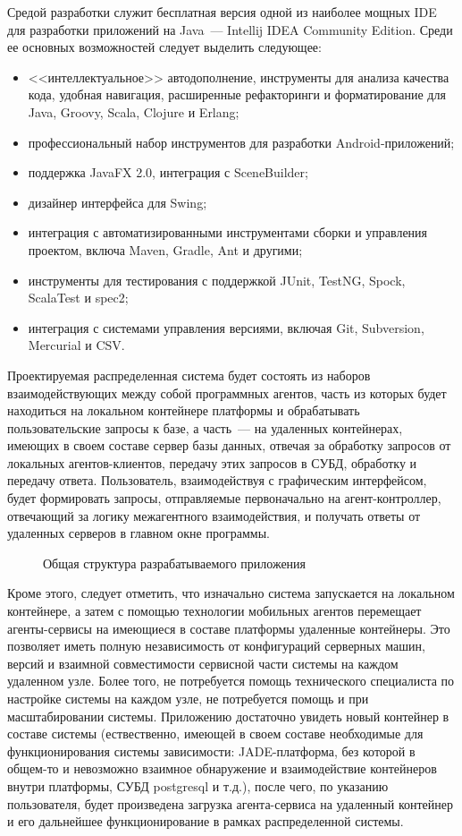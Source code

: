 Средой разработки служит бесплатная версия одной из наиболее мощных IDE для разработки приложений на Java~--- Intellij IDEA Community Edition. Среди ее основных возможностей следует выделить следующее:
\begin{itemize}
\item <<интеллектуальное>> автодополнение, инструменты для анализа качества кода, удобная навигация, расширенные рефакторинги и форматирование для Java, Groovy, Scala, Clojure и Erlang;
\item профессиональный набор инструментов для разработки Android-приложений;
\item поддержка JavaFX 2.0, интеграция с SceneBuilder;
\item дизайнер интерфейса для Swing;
\item интеграция с автоматизированными инструментами сборки и управления проектом, включа Maven, Gradle, Ant и другими;
\item инструменты для тестирования с поддержкой JUnit, TestNG, Spock, ScalaTest и spec2;
\item интеграция с системами управления версиями, включая Git, Subversion, Mercurial и CSV.
\end{itemize}

	Проектируемая распределенная система будет состоять из наборов взаимодействующих между собой программных агентов, часть из которых будет находиться на локальном контейнере платформы и обрабатывать пользовательские  запросы к базе, а часть~--- на удаленных контейнерах, имеющих в своем составе сервер базы данных, отвечая за обработку запросов от локальных агентов-клиентов, передачу этих запросов в СУБД, обработку и передачу ответа. Пользователь, взаимодействуя с графическим интерфейсом, будет формировать запросы, отправляемые первоначально на агент-контроллер, отвечающий за логику  межагентного взаимодействия, и получать ответы от удаленных серверов в главном окне программы.

\begin{figure}[h!]
\caption{Общая структура разрабатываемого приложения}
\label{3:common-scheme}
\end{figure}

Кроме этого, следует отметить, что изначально система запускается на локальном контейнере, а затем с помощью технологии мобильных агентов перемещает агенты-сервисы на имеющиеся в составе платформы удаленные контейнеры. Это позволяет иметь полную независимость от конфигураций серверных машин, версий и взаимной совместимости сервисной части системы на каждом удаленном узле. Более того, не потребуется помощь технического специалиста по настройке системы на каждом узле, не потребуется помощь и при масштабировании системы. Приложению достаточно увидеть новый контейнер в составе системы (ествественно, имеющей в своем составе необходимые для функционирования системы зависимости: JADE-платформа, без которой в общем-то и невозможно взаимное обнаружение и взаимодействие контейнеров внутри платформы, СУБД postgresql и т.д.), после чего, по указанию пользователя, будет произведена загрузка агента-сервиса на удаленный контейнер и его дальнейшее функционирование в рамках распределенной системы.

